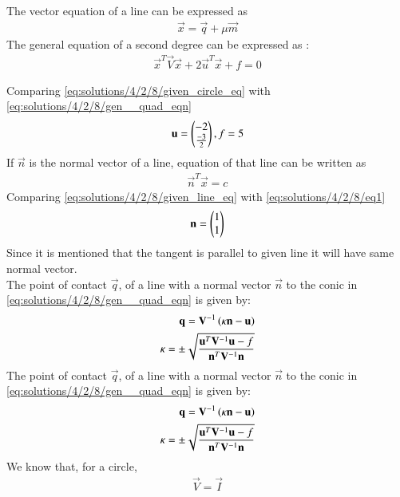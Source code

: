 The vector equation of a line can be expressed as 
\begin{align}
    \vec{x} = \vec{q} +\mu\vec{m} \label{eq:solutions/4/2/8/vec_eqn_of_line}
\end{align}
The general equation of a second degree can be expressed as :
\begin{align}
\vec{x}^T\vec{V}\vec{x}+2\vec{u}^T\vec{x}+f=0\label{eq:solutions/4/2/8/gen__quad_eqn}
\end{align}

Comparing \eqref{eq:solutions/4/2/8/given_circle_eq} with \eqref{eq:solutions/4/2/8/gen__quad_eqn}
\begin{align}
\mathbf{u}=\begin{pmatrix}-2 \\ \frac{-3}{2}\end{pmatrix}, f=5
\end{align}
If $\vec{n}$ is the normal vector of a line, equation of that line can be written as 
\begin{align}
\vec{n}^T\vec{x} = c \label{eq:solutions/4/2/8/eq1}
\end{align}
Comparing \eqref{eq:solutions/4/2/8/given_line_eq} with \eqref{eq:solutions/4/2/8/eq1}
\begin{align}
\mathbf{n} = \begin{pmatrix}1 \\ 1\end{pmatrix}\label{eq:solutions/4/2/8/eq2}
\end{align}
Since it is mentioned that the tangent is parallel to given line it will have same normal vector. \\
 The point of contact $\vec{q}$, of a line with a normal vector $\vec{n}$ to the conic in \eqref{eq:solutions/4/2/8/gen__quad_eqn} is given by:
\begin{align}
\mathbf{q} = \mathbf{V}^{-1}\left(\kappa \mathbf{n}-\mathbf{u}\right) \label{eq:solutions/4/2/8/eq3} \\
\kappa = \pm \sqrt{\frac{\mathbf{u}^T\mathbf{V}^{-1}\mathbf{u}-f}{\mathbf{n}^T\mathbf{V}^{-1}\mathbf{n}}} \label{eq:solutions/4/2/8/eq4}
\end{align}
The point of contact $\vec{q}$, of a line with a normal vector $\vec{n}$ to the conic in \eqref{eq:solutions/4/2/8/gen__quad_eqn} is given by:
\begin{align}
\mathbf{q} = \mathbf{V}^{-1}\left(\kappa \mathbf{n}-\mathbf{u}\right) 
 \\
\kappa = \pm \sqrt{\frac{\mathbf{u}^T\mathbf{V}^{-1}\mathbf{u}-f}{\mathbf{n}^T\mathbf{V}^{-1}\mathbf{n}}} 
\end{align}
We know that, for a circle, 
\begin{align}
\vec{V} = \vec{I}  
\end{align}
